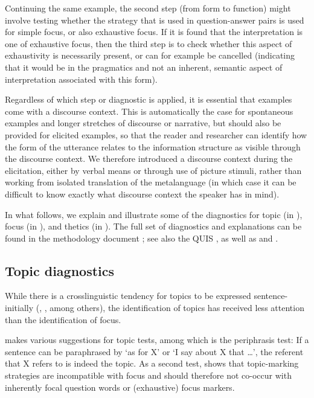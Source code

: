\documentclass[output=paper]{langscibook}
\begin{document}
  Continuing the same example, the second step (from form to function) might involve testing whether the strategy that is used in question-answer pairs is used for simple focus, or also exhaustive focus. If it is found that the interpretation is one of exhaustive focus, then the third step is to check whether this aspect of exhaustivity is necessarily present, or can for example be cancelled (indicating that it would be in the pragmatics and not an inherent, semantic aspect of interpretation associated with this form).

  Regardless of which step or diagnostic is applied, it is essential that examples come with a discourse context. This is automatically the case for spontaneous examples and longer stretches of discourse or narrative, but should also be provided for elicited examples, so that the reader and researcher can identify how the form of the utterance relates to the information structure as visible through the discourse context. We therefore introduced a discourse context during the elicitation, either by verbal means or through use of picture stimuli, rather than working from isolated translation of the metalanguage (in which case it can be difficult to know exactly what discourse context the speaker has in mind).

In what follows, we explain and illustrate some of the diagnostics for topic (in ), focus (in ), and thetics (in ). The full set of diagnostics and explanations can be found in the methodology document \citep{vanderWal2021}; see also the QUIS \citep{SkopeteasEtAl2006}, as well as \citet{RenansEtAl2010,vanderWal2016} and \citet{Aissen2023}.

\subsection{Topic diagnostics}
\label{topics}

While there is a crosslinguistic tendency for topics to be expressed sentence-initially (\citealt{Gundel1988}, \citealt{Aissen2023}, among others), the identification of topics has received less attention than the identification of focus. 

\citet{Reinhart1981} makes various suggestions for topic tests, among which is the periphrasis test: If a sentence can be paraphrased by ‘as for X’ or ‘I say about X that …’, the referent that X refers to is indeed the topic. As a second test, \citet{Ameka1991} shows that topic-marking strategies are incompatible with focus and should therefore not co-occur with inherently focal question words or (exhaustive) focus markers. 
\end{document}
